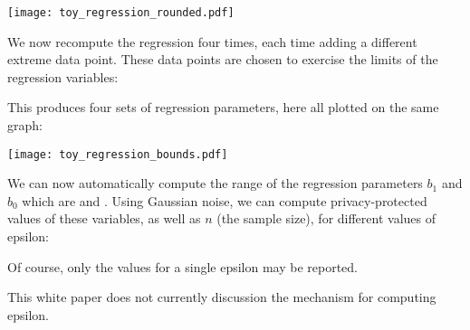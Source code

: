 \documentclass{article}
\begin{document}
\texttt{[image: toy\_regression\_rounded.pdf]}

We now recompute the regression four times, each time adding a different
extreme data point. These data points are chosen to exercise the limits of
the regression variables:



This produces four sets of regression parameters, here all plotted on
the same graph:

\texttt{[image: toy\_regression\_bounds.pdf]}

We can now automatically compute the range of the regression
parameters $b_1$ and $b_0$ which are \Gzero and \Gone. Using Gaussian noise, we can compute 
privacy-protected values of these variables, as well as $n$ (the
sample size), for different values of epsilon:



Of course, only the values for a single epsilon may be reported. 

This white paper does not currently discussion the mechanism for
computing epsilon. 
\end{document}
